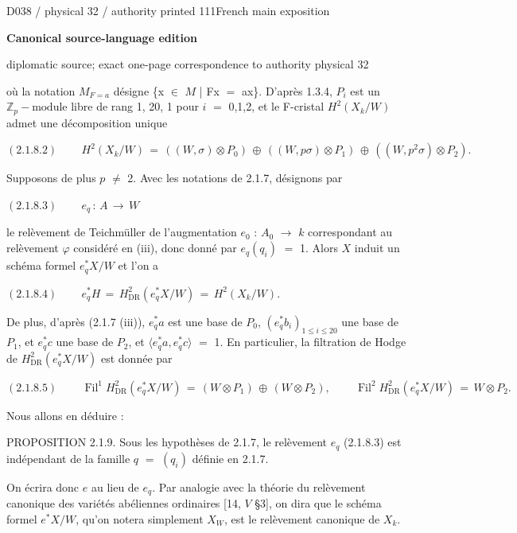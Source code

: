 \documentclass[9pt]{article}
\newcommand{\CanonText}[1]{\par{\fontsize{8.0}{9.35}\selectfont\RaggedRight #1\par}\vspace{2.2pt}}
\newcommand{\CanonDisplay}[1]{\par\vspace{1.2pt}\begin{center}{\fontsize{7.2}{8.4}\selectfont\(\displaystyle #1\)}\end{center}\vspace{1.2pt}}
\newcommand{\LayerTitle}{Canonical source-language edition}
\begin{document}
\noindent\begin{minipage}[t][\dimexpr\textheight-5pt\relax][t]{\textwidth}
{\sffamily\fontsize{7.3}{8.2}\selectfont\color{Quiet} D038 / physical 32 / authority printed 111\hfill French main exposition}
\par{}\vspace{4.5pt}
{\sffamily\fontsize{10.4}{11.6}\selectfont\bfseries\color{Accent} \LayerTitle}
\par{\sffamily\fontsize{6.7}{7.7}\selectfont\color{Quiet} diplomatic source; exact one-page correspondence to authority physical 32}
\vspace{5pt}
\CanonText{où la notation \(M_{F=a}\) désigne \{x \(\in{}\) \(M\) | Fx \(=\) ax\}. D'après 1.3.4, \(P_{i}\) est un \(\mathbb{Z}_{p}-\text{module}\) libre de rang 1, 20, 1 pour \(i\) \(=\) 0,1,2, et le F-cristal \(H^{2}(X_{k}/W)\) admet une décomposition unique}
\CanonDisplay{(2.1.8.2)\qquad\,H^{2}(X_{k}/W)\,=\,((W,\sigma{})\otimes{}P_{0})\,\oplus{}\,((W,p\sigma{})\otimes{}P_{1})\,\oplus{}\,((W,p^{2}\sigma{})\otimes{}P_{2}).}
\CanonText{Supposons de plus \(p\) \(\neq{}\) 2. Avec les notations de 2.1.7, désignons par}
\CanonDisplay{(2.1.8.3)\qquad\,e_{q}\,:\,A\,\to{}\,W}
\CanonText{le relèvement de Teichmüller de l'augmentation \(e_{0}\) : \(A_{0}\) \(\to{}\) \(k\) correspondant au relèvement \(\varphi{}\) considéré en (iii), donc donné par \(e_{q}(q_{i})\) \(=\) 1. Alors \(X\) induit un schéma formel \(e_{q}^{*}X/W\) et l'on a}
\CanonDisplay{(2.1.8.4)\qquad\,e_{q}^{*}H\,=\,H^{2}_{\mathrm{DR}}(e_{q}^{*}X/W)\,=\,H^{2}(X_{k}/W).}
\CanonText{De plus, d'après (2.1.7 (iii)), \(e_{q}^{*}a\) est une base de \(P_{0}\), \((e_{q}^{*}b_{i})_{1\leq{}i\leq{}20}\) une base de \(P_{1}\), et \(e_{q}^{*}c\) une base de \(P_{2}\), et \(\langle{}e_{q}^{*}a,e_{q}^{*}c\rangle{}\) \(=\) 1. En particulier, la filtration de Hodge de \(H^{2}_{\mathrm{DR}}(e_{q}^{*}X/W)\) est donnée par}
\CanonDisplay{(2.1.8.5)\qquad\,\operatorname{Fil}^{1}H^{2}_{\mathrm{DR}}(e_{q}^{*}X/W)\,=\,(W\otimes{}P_{1})\,\oplus{}\,(W\otimes{}P_{2}),\qquad\,\operatorname{Fil}^{2}H^{2}_{\mathrm{DR}}(e_{q}^{*}X/W)\,=\,W\otimes{}P_{2}.}
\CanonText{Nous allons en déduire :}
\CanonText{PROPOSITION 2.1.9. Sous les hypothèses de 2.1.7, le relèvement \(e_{q}\) (2.1.8.3) est indépendant de la famille \(q\) \(=\) \((q_{i})\) définie en 2.1.7.}
\CanonText{On écrira donc \(e\) au lieu de \(e_{q}\). Par analogie avec la théorie du relèvement canonique des variétés abéliennes ordinaires [14, \(V\) §3], on dira que le schéma formel \(e^{*}X/W\), qu'on notera simplement \(X_{W}\), est le relèvement canonique de \(X_{k}\).}

\end{minipage}
\end{document}
